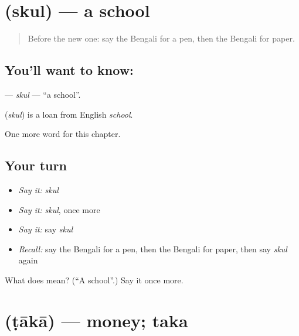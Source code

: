 \section[\texorpdfstring{\bn{স্কুল} (skul)}{স্কুল (skul)}]{ (skul) — a school}

\label{lesson:BN-C64-skul}



\begin{quote}
Before the new one: say the Bengali for a pen, then the Bengali for paper.
\end{quote}

\subsection*{You'll want to know: }
\textbf{} — \emph{skul} — \textquotedblleft{}a school\textquotedblright{}.

\begin{cousinweb}
\textbf{} (\emph{skul}) is a loan from English \emph{school}.
\end{cousinweb}

\begin{grammarlens}[title={What you've built}]
One more word for this chapter.
\end{grammarlens}

\subsection*{Your turn}
\begin{itemize}
\raggedright
  \item \emph{Say it:} \emph{skul}
  \item \emph{Say it:} \emph{skul}, once more
  \item \emph{Say it:} say \emph{skul}
  \item \emph{Recall:} say the Bengali for a pen, then the Bengali for paper, then say \emph{skul} again
\end{itemize}

\begin{tcolorbox}[breakable,colback=teal!4,colframe=teal!35!black,title={Before you move on}]
What does  mean? (\textquotedblleft{}A school\textquotedblright{}.) Say it once more.
\end{tcolorbox}
\section[\texorpdfstring{\bn{টাকা} (ṭākā)}{টাকা (ṭākā)}]{ (ṭākā) — money; taka}

